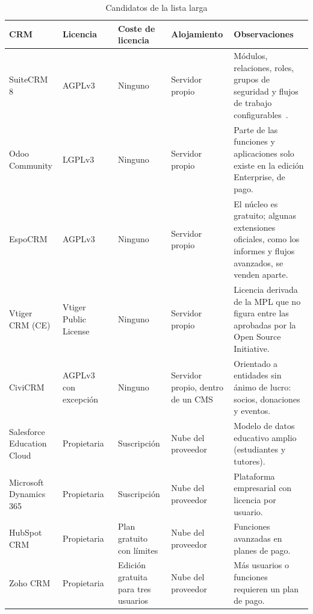 \begin{table}[H]
\centering\footnotesize
\begin{tabularx}{\textwidth}{>{\hsize=0.80\hsize\raggedright\arraybackslash}X>{\hsize=1.00\hsize\raggedright\arraybackslash}X>{\hsize=0.95\hsize\raggedright\arraybackslash}X>{\hsize=0.85\hsize\raggedright\arraybackslash}X>{\hsize=1.40\hsize\raggedright\arraybackslash}X}
\toprule
\rowcolor{cabeceratabla} \textbf{CRM} & \textbf{Licencia} & \textbf{Coste de licencia} & \textbf{Alojamiento} & \textbf{Observaciones} \\
\midrule
SuiteCRM 8 & AGPLv3~\cite{ref06} & Ninguno & Servidor propio & Módulos, relaciones, roles, grupos de seguridad y flujos de trabajo configurables~\cite{ref07,ref08,ref09}. \\
Odoo Community & LGPLv3~\cite{ref48} & Ninguno & Servidor propio & Parte de las funciones y aplicaciones solo existe en la edición Enterprise, de pago. \\
EspoCRM & AGPLv3~\cite{ref42} & Ninguno & Servidor propio & El núcleo es gratuito; algunas extensiones oficiales, como los informes y flujos avanzados, se venden aparte. \\
Vtiger CRM (CE) & Vtiger Public License~\cite{ref43} & Ninguno & Servidor propio & Licencia derivada de la MPL que no figura entre las aprobadas por la Open Source Initiative. \\
CiviCRM & AGPLv3 con excepción~\cite{ref44} & Ninguno & Servidor propio, dentro de un CMS & Orientado a entidades sin ánimo de lucro: socios, donaciones y eventos. \\
Salesforce Education Cloud & Propietaria~\cite{ref11} & Suscripción & Nube del proveedor & Modelo de datos educativo amplio (estudiantes y tutores). \\
Microsoft Dynamics 365 & Propietaria~\cite{ref47} & Suscripción & Nube del proveedor & Plataforma empresarial con licencia por usuario. \\
HubSpot CRM & Propietaria~\cite{ref46} & Plan gratuito con límites & Nube del proveedor & Funciones avanzadas en planes de pago. \\
Zoho CRM & Propietaria~\cite{ref45} & Edición gratuita para tres usuarios & Nube del proveedor & Más usuarios o funciones requieren un plan de pago. \\
\bottomrule
\end{tabularx}
\caption{Candidatos de la lista larga}\label{tab:dis-candidatos}
\end{table}

